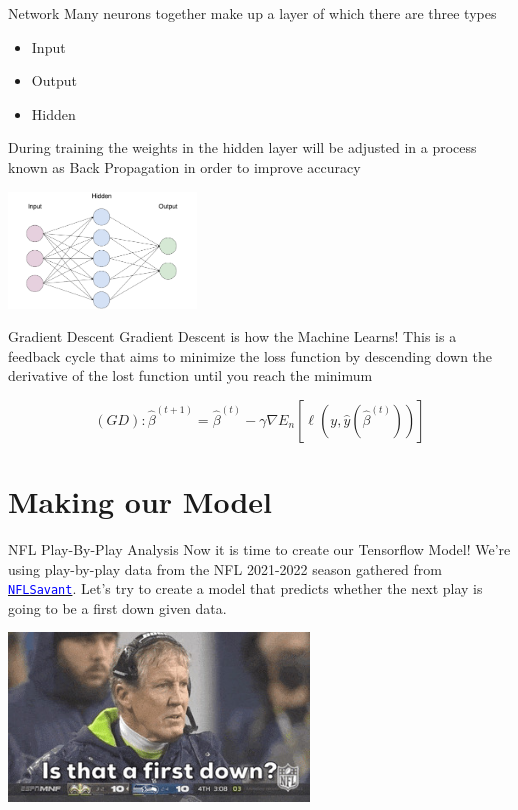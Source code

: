 \documentclass{beamer}
\begin{document}
\begin{frame}[fragile]{Network}
Many neurons together make up a layer of which there are three types
\begin{itemize}
	\item Input
	\item Output
	\item Hidden
\end{itemize}
During training the weights in the hidden layer will be adjusted in a process known as Back Propagation in order to improve accuracy
\begin{center}
{\includegraphics[width=5cm]{images/neuralnetdiagram.png}}
\end{center}
\end{frame}

\begin{frame}[fragile]{Gradient Descent}
Gradient Descent is how the Machine Learns! This is a feedback cycle that aims to minimize the loss function by descending down the derivative of the lost function until you reach the minimum
\begin{example}
	\begin{equation*}
	\left( {GD} \right):{\hat \beta ^{\left( {t + 1} \right)}} = {\hat \beta ^{\left( t \right)}} - \gamma \nabla {E_n}\left[ {\ell \left( {y,\hat y\left( {{{\hat \beta }^{\left( t \right)}}} \right)} \right)} \right]
	\end{equation*}
	\end{example}
\end{frame}

\section{Making our Model}

\begin{frame}[fragile]{NFL Play-By-Play Analysis}
Now it is time to create our Tensorflow Model! We're using play-by-play data from the NFL 2021-2022 season gathered from \href{http://nflsavant.com/about.php}{\tt \textcolor{blue}{NFLSavant}}. Let's try to create a model that predicts whether the next play is going to be a first down given data. 
\begin{center}
{\includegraphics[width=8cm]{images/pete.jpg}}
\end{center}
\end{frame}
\end{document}
